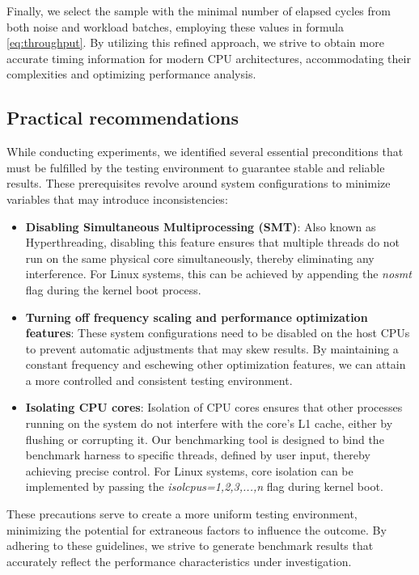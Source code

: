 Finally, we select the sample with the minimal number of elapsed cycles from both noise and workload 
batches, employing these values in formula \ref{eq:throughput}. By utilizing this refined approach, 
we strive to obtain more accurate timing information for modern CPU architectures, accommodating their 
complexities and optimizing performance analysis.

\subsection{Practical recommendations}

While conducting experiments, we identified several essential preconditions that must be fulfilled by 
the testing environment to guarantee stable and reliable results. These prerequisites revolve around 
system configurations to minimize variables that may introduce inconsistencies:

\begin{itemize}
	\item \textbf{Disabling Simultaneous Multiprocessing (SMT)}: Also known as Hyperthreading, disabling this feature ensures that multiple threads do not run on the same physical core simultaneously, thereby eliminating any interference. For Linux systems, this can be achieved by appending the \textit{nosmt} flag during the kernel boot process.
	\item \textbf{Turning off frequency scaling and performance optimization features}: These system configurations need to be disabled on the host CPUs to prevent automatic adjustments that may skew results. By maintaining a constant frequency and eschewing other optimization features, we can attain a more controlled and consistent testing environment.
	\item \textbf{Isolating CPU cores}: Isolation of CPU cores ensures that other processes running on the system do not interfere with the core's L1 cache, either by flushing or corrupting it. Our benchmarking tool is designed to bind the benchmark harness to specific threads, defined by user input, thereby achieving precise control. For Linux systems, core isolation can be implemented by passing the \textit{isolcpus=1,2,3,...,n} flag during kernel boot.
\end{itemize}

These precautions serve to create a more uniform testing environment, minimizing the potential for 
extraneous factors to influence the outcome. By adhering to these guidelines, we strive to generate 
benchmark results that accurately reflect the performance characteristics under investigation.

